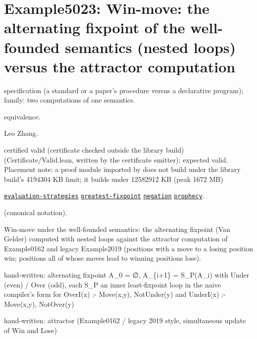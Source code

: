 \documentclass[10pt]{article}
\begin{document}
\Needspace{0.45\textheight}

\section{Example5023: Win-move: the alternating fixpoint of the well-founded semantics (nested loops) versus the attractor computation}\label{case:Example5023}

\begin{description}[leftmargin=2.6cm,style=nextline,itemsep=1pt]

\item[Category] specification (a standard or a paper's procedure versus a declarative program); family: two computations of one semantics.

\item[Kind] equivalence.

\item[Contributors] Leo Zhang.

\item[Status] certified valid (certificate checked outside the library build) (Certificate/Valid.lean, written by the certificate emitter); expected valid. Placement note: a proof module imported by  does not build under the library build's 4194304 KB limit; it builds under 12582912 KB (peak 1672 MB)

\item[Tags] \hyperref[tag:evaluation-strategies]{\texttt{evaluation-strategies}} \hyperref[tag:greatest-fixpoint]{\texttt{greatest-fixpoint}} \hyperref[tag:negation]{\texttt{negation}} \hyperref[tag:prophecy]{\texttt{prophecy}}.

\item[Input]  (canonical notation).

\item[Summary] Win-move under the well-founded semantics: the alternating fixpoint (Van Gelder) computed with nested loops against the attractor computation of Example0162 and legacy Example2019 (positions with a move to a losing position win; positions all of whose moves lead to winning positions lose).

\item[Sides] hand-written: alternating fixpoint A\_0 = ∅, A\_\{i+1\} = S\_P(A\_i) with Under (even) / Over (odd), each S\_P an inner least-fixpoint loop in the naive compiler's form for OverI(x) :- Move(x,y), NotUnder(y) and UnderI(x) :- Move(x,y), NotOver(y) \par hand-written: attractor (Example0162 / legacy 2019 style, simultaneous update of Win and Lose)


\end{description}
\end{document}

